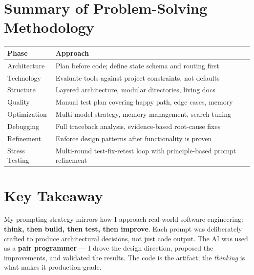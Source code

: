 \documentclass[12pt, a4paper]{article}
\begin{document}
\section*{Summary of Problem-Solving Methodology}

\begin{center}
\begin{tabular}{|l|l|}
\hline
\textbf{Phase} & \textbf{Approach} \\
\hline
Architecture & Plan before code; define state schema and routing first \\
Technology & Evaluate tools against project constraints, not defaults \\
Structure & Layered architecture, modular directories, living docs \\
Quality & Manual test plan covering happy path, edge cases, memory \\
Optimization & Multi-model strategy, memory management, search tuning \\
Debugging & Full traceback analysis, evidence-based root-cause fixes \\
Refinement & Enforce design patterns after functionality is proven \\
Stress Testing & Multi-round test-fix-retest loop with principle-based prompt refinement \\
\hline
\end{tabular}
\end{center}

\vspace{10pt}

\section*{Key Takeaway}

My prompting strategy mirrors how I approach real-world software engineering: \textbf{think, then build, then test, then improve}. Each prompt was deliberately crafted to produce architectural decisions, not just code output. The AI was used as a \textbf{pair programmer} — I drove the design direction, proposed the improvements, and validated the results. The code is the artifact; the \textit{thinking} is what makes it production-grade.
\end{document}
